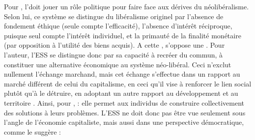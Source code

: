             Pour \textcite{defalvard2016leconomie}, l'\ess doit jouer un rôle politique pour faire face aux dérives du néolibéralisme. Selon lui, ce système se distingue du libéralisme originel par l’absence de fondement éthique (seule compte l’efficacité), l’absence d’intérêt réciproque, puisque seul compte l’intérêt individuel, et la primauté de la finalité monétaire (par opposition à l’utilité des biens acquis). A cette , s’oppose une . Pour l’auteur, l’ESS se distingue donc par sa capacité à recréer du commun, à constituer une alternative économique  au système néo-libéral. Ceci n’exclut nullement l’échange marchand, mais cet échange s’effectue dans un rapport au marché différent de celui du capitalisme, en ceci qu’il vise à renforcer le lien social plutôt qu’à le détruire, en adoptant un autre rapport au  développement et au territoire \parencite{draperi2015leconomie}.  Ainsi, pour \textcite[][p.64]{laville2016economie},  : elle permet aux individus de construire collectivement des solutions à leurs problèmes. L’ESS ne doit donc pas être vue seulement sous l’angle de l’économie capitaliste, mais aussi dans une perspective démocratique, comme le suggère \textcite{eikenberry2009refusing} :
            \begin{quotation}
            \end{quotation}

